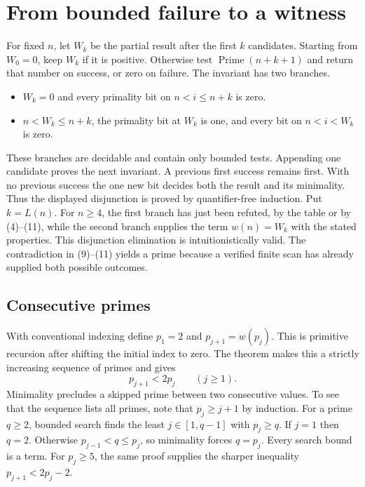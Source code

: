 \documentclass[12pt,letterpaper]{article}
\newcommand{\Prime}{\operatorname{Prime}}
\newcommand{\w}{w}
\newcommand{\pagepart}{\clearpage}
\begin{document}
\pagepart\section{From bounded failure to a witness}\label{s:witness}
For fixed \(n\), let \(W_k\) be the partial result after the first \(k\) candidates. Starting from \(W_0=0\), keep \(W_k\) if it is positive. Otherwise test \(\Prime(n+k+1)\) and return that number on success, or zero on failure. The invariant has two branches.
\begin{itemize}
\item \(W_k=0\) and every primality bit on \(n<i\le n+k\) is zero.
\item \(n<W_k\le n+k\), the primality bit at \(W_k\) is one, and every bit on \(n<i<W_k\) is zero.
\end{itemize}
These branches are decidable and contain only bounded tests. Appending one candidate proves the next invariant. A previous first success remains first. With no previous success the one new bit decides both the result and its minimality. Thus the displayed disjunction is proved by quantifier-free induction. Put \(k=L(n)\). For \(n\ge4\), the first branch has just been refuted, by the table or by (4)--(11), while the second branch supplies the term \(\w(n)=W_k\) with the stated properties. This disjunction elimination is intuitionistically valid. The contradiction in (9)--(11) yields a prime because a verified finite scan has already supplied both possible outcomes.

\subsection*{Consecutive primes}
With conventional indexing define \(p_1=2\) and \(p_{j+1}=\w(p_j)\). This is primitive recursion after shifting the initial index to zero. The theorem makes this a strictly increasing sequence of primes and gives
\[
             p_{j+1}<2p_j\qquad (j\ge1).
\]
Minimality precludes a skipped prime between two consecutive values. To see that the sequence lists all primes, note that \(p_j\ge j+1\) by induction. For a prime \(q\ge2\), bounded search finds the least \(j\in[1,q-1]\) with \(p_j\ge q\). If \(j=1\) then \(q=2\). Otherwise \(p_{j-1}<q\le p_j\), so minimality forces \(q=p_j\). Every search bound is a term. For \(p_j\ge5\), the same proof supplies the sharper inequality \(p_{j+1}<2p_j-2\).
\end{document}
